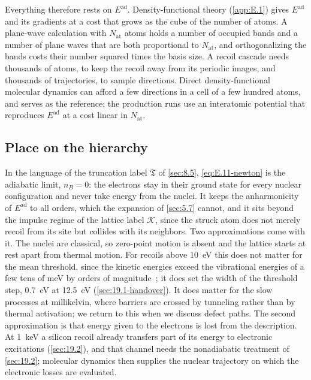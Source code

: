 Everything therefore rests on $E^{\mathrm{ad}}$. Density-functional theory (\cref{app:E.1}) gives $E^{\mathrm{ad}}$ and its gradients at a cost that grows as the cube of the number of atoms. A plane-wave calculation with $N_{\mathrm{at}}$ atoms holds a number of occupied bands and a number of plane waves that are both proportional to $N_{\mathrm{at}}$, and orthogonalizing the bands costs their number squared times the basis size. A recoil cascade needs thousands of atoms, to keep the recoil away from its periodic images, and thousands of trajectories, to sample directions. Direct density-functional molecular dynamics can afford a few directions in a cell of a few hundred atoms, and serves as the reference; the production runs use an interatomic potential that reproduces $E^{\mathrm{ad}}$ at a cost linear in $N_{\mathrm{at}}$.

\subsection{Place on the hierarchy}

In the language of the truncation label $\mathfrak{T}$ of \cref{sec:8.5}, \cref{eq:E.11-newton} is the adiabatic limit, $n_B = 0$: the electrons stay in their ground state for every nuclear configuration and never take energy from the nuclei. It keeps the anharmonicity of $E^{\mathrm{ad}}$ to all orders, which the expansion of \cref{sec:5.7} cannot, and it sits beyond the impulse regime of the lattice label $\mathcal{K}$, since the struck atom does not merely recoil from its site but collides with its neighbors. Two approximations come with it. The nuclei are classical, so zero-point motion is absent and the lattice starts at rest apart from thermal motion. For recoils above \SI{10}{eV} this does not matter for the mean threshold, since the kinetic energies exceed the vibrational energies of a few tens of meV by orders of magnitude~\cite[Sect.~II\,A]{sassi2022energy}; it does set the width of the threshold step, \SI{0.7}{eV} at \SI{12.5}{eV} (\cref{sec:19.1-handover}). It does matter for the slow processes at millikelvin, where barriers are crossed by tunneling rather than by thermal activation; we return to this when we discuss defect paths. The second approximation is that energy given to the electrons is lost from the description. At \SI{1}{keV} a silicon recoil already transfers part of its energy to electronic excitations (\cref{sec:19.2}), and that channel needs the nonadiabatic treatment of \cref{sec:19.2}; molecular dynamics then supplies the nuclear trajectory on which the electronic losses are evaluated.

